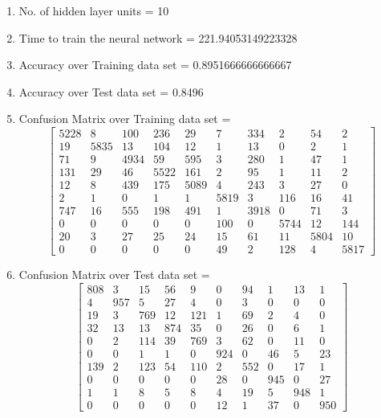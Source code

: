 \documentclass[11pt]{article}
\begin{document}
\hline
\begin{enumerate}
\item No. of hidden layer units = 10
\item Time to train the neural network = 221.94053149223328
\item Accuracy over Training data set = 0.8951666666666667
\item Accuracy over Test data set = 0.8496
\item Confusion Matrix over Training data set = 
\begin{equation}
  \begin{bmatrix}
5228 & 8 & 100 & 236 & 29 & 7 & 334 & 2 & 54 & 2\\
19 & 5835 & 13 & 104 & 12 & 1 & 13 & 0 & 2 & 1\\
71 & 9 & 4934 & 59 & 595 & 3 & 280 & 1 & 47 & 1\\
131 & 29 & 46 & 5522 & 161 & 2 & 95 & 1 & 11 & 2\\
12 & 8 & 439 & 175 & 5089 & 4 & 243 & 3 & 27 & 0\\
2 & 1 & 0 & 1 & 1 & 5819 & 3 & 116 & 16 & 41\\
747 & 16 & 555 & 198 & 491 & 1 & 3918 & 0 & 71 & 3\\
0 & 0 & 0 & 0 & 0 & 100 & 0 & 5744 & 12 & 144\\
20 & 3 & 27 & 25 & 24 & 15 & 61 & 11 & 5804 & 10\\
0 & 0 & 0 & 0 & 0 & 49 & 2 & 128 & 4 & 5817
  \end{bmatrix}
\end{equation}
\item Confusion Matrix over Test data set = 
\begin{equation}
  \begin{bmatrix}
808 & 3 & 15 & 56 & 9 & 0 & 94 & 1 & 13 & 1\\
4 & 957 & 5 & 27 & 4 & 0 & 3 & 0 & 0 & 0\\
19 & 3 & 769 & 12 & 121 & 1 & 69 & 2 & 4 & 0\\
32 & 13 & 13 & 874 & 35 & 0 & 26 & 0 & 6 & 1\\
0 & 2 & 114 & 39 & 769 & 3 & 62 & 0 & 11 & 0\\
0 & 0 & 1 & 1 & 0 & 924 & 0 & 46 & 5 & 23\\
139 & 2 & 123 & 54 & 110 & 2 & 552 & 0 & 17 & 1\\
0 & 0 & 0 & 0 & 0 & 28 & 0 & 945 & 0 & 27\\
1 & 1 & 8 & 5 & 8 & 4 & 19 & 5 & 948 & 1\\
0 & 0 & 0 & 0 & 0 & 12 & 1 & 37 & 0 & 950
  \end{bmatrix}
\end{equation}
\end{enumerate}
\end{document}

